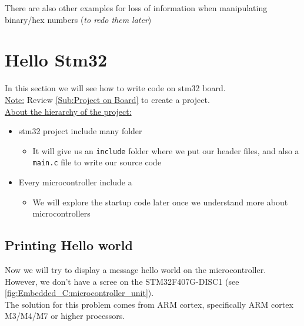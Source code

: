 There are also other examples for loss of information when manipulating binary/hex numbers (\textit{to redo them later})


\newpage

\section{Hello Stm32}

In this section we will see how to write code on stm32 board.\\

\underline{Note:} Review \autoref{Sub:Project on Board} to create a project.\\

\underline{About the hierarchy of the project:} 

\begin{itemize}
    \item stm32 project include many folder
    
    \begin{itemize}
        \item It will give us an \verb|include| folder where we put our header files, and also a \verb|main.c| file to write our source code
    \end{itemize}
    
    \item Every microcontroller include a 
    
    \begin{itemize}
        \item We will explore the startup code later once we understand more about microcontrollers
    \end{itemize}
    
\end{itemize}

\subsection{Printing Hello world}
\label{Sub:Printing_hello_world}

Now we will try to display a message hello world on the microcontroller. However, we don't have a scree on the STM32F407G-DISC1 (see \autoref{fig:Embedded_C:microcontroller_unit}).\\

The solution for this problem comes from ARM cortex, specifically ARM cortex M3/M4/M7 or higher processors.\\

